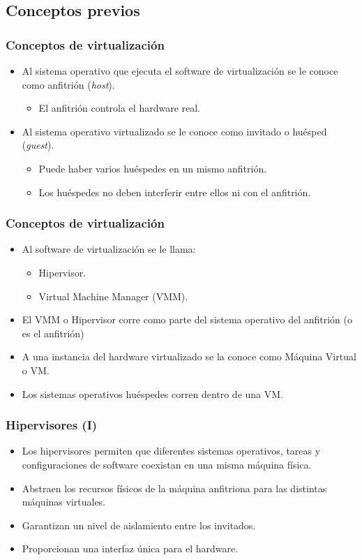 \documentclass{beamer}
\begin{document}
\subsection{Conceptos previos}
\begin{frame}
  \frametitle{Conceptos de virtualización}
  \begin{itemize}
  \item Al sistema operativo que ejecuta el software de virtualización
    se le conoce como anfitrión (\emph{host}).
    \begin{itemize}
    \item El anfitrión controla el hardware real.
    \end{itemize}
    \item Al sistema operativo virtualizado se le conoce como invitado
      o huésped (\emph{guest}).
      \begin{itemize}
      \item Puede haber varios huéspedes en un mismo anfitrión.
      \item Los huéspedes no deben interferir entre ellos ni con el
        anfitrión.
      \end{itemize}
  \end{itemize}
\end{frame}

\begin{frame}
  \frametitle{Conceptos de virtualización}
  \begin{itemize}
  \item Al software de virtualización se le llama:
    \begin{itemize}
    \item Hipervisor.
    \item Virtual Machine Manager (VMM).
    \end{itemize}
  \item El VMM o Hipervisor corre como parte del sistema operativo
    del anfitrión (o es el anfitrión)
  \item A una instancia del hardware virtualizado se la conoce
    como Máquina Virtual o VM.
  \item Los sistemas operativos huéspedes corren dentro de una
    VM. 
  \end{itemize}
\end{frame}

\begin{frame}
  \frametitle{Hipervisores (I)}
  \begin{itemize}
  \item Los hipervisores permiten que diferentes sistemas operativos,
    tareas y configuraciones de software coexistan en una misma
    máquina física.
  \item Abstraen los recursos físicos de la máquina anfitriona para las
    distintas máquinas virtuales.
  \item Garantizan un nivel de aislamiento entre los invitados.
  \item Proporcionan una interfaz única para el hardware.
  \end{itemize}
\end{frame}
\end{document}
